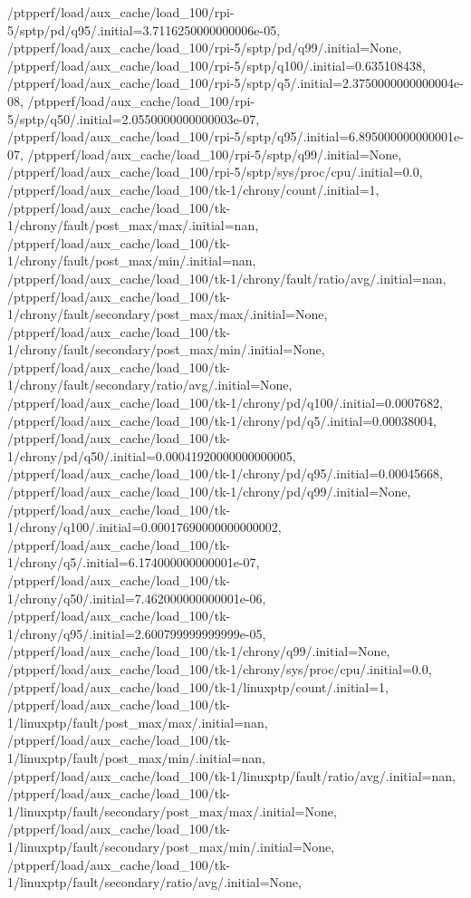 {    /ptpperf/load/aux_cache/load_100/rpi-5/sptp/pd/q95/.initial=3.7116250000000006e-05,
    /ptpperf/load/aux_cache/load_100/rpi-5/sptp/pd/q99/.initial=None,
    /ptpperf/load/aux_cache/load_100/rpi-5/sptp/q100/.initial=0.635108438,
    /ptpperf/load/aux_cache/load_100/rpi-5/sptp/q5/.initial=2.3750000000000004e-08,
    /ptpperf/load/aux_cache/load_100/rpi-5/sptp/q50/.initial=2.0550000000000003e-07,
    /ptpperf/load/aux_cache/load_100/rpi-5/sptp/q95/.initial=6.895000000000001e-07,
    /ptpperf/load/aux_cache/load_100/rpi-5/sptp/q99/.initial=None,
    /ptpperf/load/aux_cache/load_100/rpi-5/sptp/sys/proc/cpu/.initial=0.0,
    /ptpperf/load/aux_cache/load_100/tk-1/chrony/count/.initial=1,
    /ptpperf/load/aux_cache/load_100/tk-1/chrony/fault/post_max/max/.initial=nan,
    /ptpperf/load/aux_cache/load_100/tk-1/chrony/fault/post_max/min/.initial=nan,
    /ptpperf/load/aux_cache/load_100/tk-1/chrony/fault/ratio/avg/.initial=nan,
    /ptpperf/load/aux_cache/load_100/tk-1/chrony/fault/secondary/post_max/max/.initial=None,
    /ptpperf/load/aux_cache/load_100/tk-1/chrony/fault/secondary/post_max/min/.initial=None,
    /ptpperf/load/aux_cache/load_100/tk-1/chrony/fault/secondary/ratio/avg/.initial=None,
    /ptpperf/load/aux_cache/load_100/tk-1/chrony/pd/q100/.initial=0.0007682,
    /ptpperf/load/aux_cache/load_100/tk-1/chrony/pd/q5/.initial=0.00038004,
    /ptpperf/load/aux_cache/load_100/tk-1/chrony/pd/q50/.initial=0.00041920000000000005,
    /ptpperf/load/aux_cache/load_100/tk-1/chrony/pd/q95/.initial=0.00045668,
    /ptpperf/load/aux_cache/load_100/tk-1/chrony/pd/q99/.initial=None,
    /ptpperf/load/aux_cache/load_100/tk-1/chrony/q100/.initial=0.00017690000000000002,
    /ptpperf/load/aux_cache/load_100/tk-1/chrony/q5/.initial=6.174000000000001e-07,
    /ptpperf/load/aux_cache/load_100/tk-1/chrony/q50/.initial=7.462000000000001e-06,
    /ptpperf/load/aux_cache/load_100/tk-1/chrony/q95/.initial=2.600799999999999e-05,
    /ptpperf/load/aux_cache/load_100/tk-1/chrony/q99/.initial=None,
    /ptpperf/load/aux_cache/load_100/tk-1/chrony/sys/proc/cpu/.initial=0.0,
    /ptpperf/load/aux_cache/load_100/tk-1/linuxptp/count/.initial=1,
    /ptpperf/load/aux_cache/load_100/tk-1/linuxptp/fault/post_max/max/.initial=nan,
    /ptpperf/load/aux_cache/load_100/tk-1/linuxptp/fault/post_max/min/.initial=nan,
    /ptpperf/load/aux_cache/load_100/tk-1/linuxptp/fault/ratio/avg/.initial=nan,
    /ptpperf/load/aux_cache/load_100/tk-1/linuxptp/fault/secondary/post_max/max/.initial=None,
    /ptpperf/load/aux_cache/load_100/tk-1/linuxptp/fault/secondary/post_max/min/.initial=None,
    /ptpperf/load/aux_cache/load_100/tk-1/linuxptp/fault/secondary/ratio/avg/.initial=None,
}
